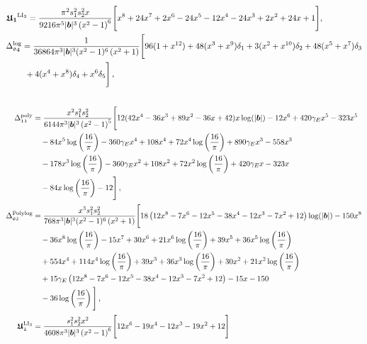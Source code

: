 \begin{thesiscompactdisplay}[\scriptsize]
\begin{align}
\begin{split}
&\boldsymbol{\mathfrak{U}_1}^{\textrm{LI}_3}=\frac{ \pi ^2 s_1^2 s_2^2 x}{9216 \pi ^5 |\boldsymbol{b}|^3 \left(x^2-1\right)^6}\Bigg[x^8+24 x^7+2 x^6-24 x^5-12 x^4-24 x^3+2 x^2+24 x+1\Bigg],
\\ &
\Delta_{\mathfrak{04}}^{\textrm{log}}=\frac{1}{36864 \pi ^3 |\boldsymbol{b}|^3 (x^2-1)^6 \left(x^2+1\right) }\Bigg[96(1+x^{12})+48(x^3+x^{9})\delta_1+3(x^2+x^{10})\delta_2+48(x^5+x^7)\delta_3\\ &\hspace{0.8cm}+4(x^4+x^8)\delta_4+x^6\delta_5\Bigg]\,,\\&
\end{split}
\end{align}
\begin{align}
\Delta_{\mathfrak{11}}^{\textrm{poly}}
&= \frac{x^2 s_1^2 s_2^2}{6144 \pi ^3 |\boldsymbol{b}|^3 \left(x^2-1\right)^5 }\Bigg[
12 (42 x^4-36 x^3+89 x^2-36 x+42) x \log(|\boldsymbol{b}|)-12 x^6+420 \gamma_E  x^5-323 x^5
\notag\\
&\quad -84 x^5 \log \left(\frac{16}{\pi }\right)-360 \gamma_E  x^4+108 x^4+72 x^4 \log \left(\frac{16}{\pi }\right)+890 \gamma_E  x^3-558 x^3
\notag\\
&\quad -178 x^3 \log \left(\frac{16}{\pi }\right)-360 \gamma_E  x^2+108 x^2+72 x^2 \log \left(\frac{16}{\pi }\right)+420 \gamma_E  x-323 x
\notag\\
&\quad -84 x \log \left(\frac{16}{\pi }\right)-12\Bigg]\,, \notag\\[2pt]
\Delta_{\mathfrak{02}}^{\textrm{Polylog}}
&= \frac{x^3 s_1^2 s_2^2}{768 \pi ^3 |\boldsymbol{b}|^3 (x^2-1)^6 \left(x^2+1\right) }\Bigg[
18 \left(12 x^8-7 x^6-12 x^5-38 x^4-12 x^3-7 x^2+12\right) \log (|\boldsymbol{b}|)-150 x^8
\notag\\
&\quad -36 x^8 \log \left(\frac{16}{\pi }\right)-15 x^7+30 x^6+21 x^6 \log \left(\frac{16}{\pi }\right)+39 x^5+36 x^5 \log \left(\frac{16}{\pi }\right)
\notag\\
&\quad +554 x^4+114 x^4 \log \left(\frac{16}{\pi }\right)+39 x^3+36 x^3 \log \left(\frac{16}{\pi }\right)+30 x^2+21 x^2 \log \left(\frac{16}{\pi }\right)
\notag\\
&\quad +15 \gamma_E  \left(12 x^8-7 x^6-12 x^5-38 x^4-12 x^3-7 x^2+12\right)-15 x-150
\notag\\
&\quad -36 \log \left(\frac{16}{\pi }\right)\Bigg]\,, \notag\\[2pt]
\boldsymbol{\mathfrak{U}}_{\mathfrak{2}}^{\textrm{LI}_3}
&= \frac{s_1^2 s_2^2 x^2}{4608 \pi ^3 |\boldsymbol{b}|^3 \left(x^2-1\right)^6}\Bigg[
12 x^6-19 x^4-12 x^3-19 x^2+12\Bigg]
\end{align}
\end{thesiscompactdisplay}
